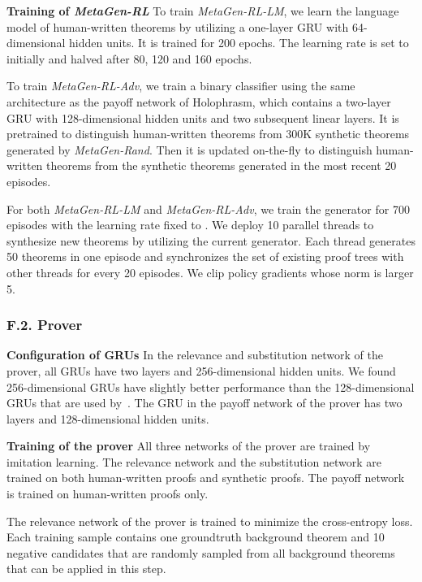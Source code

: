 \documentclass{article}
\begin{document}
\noindent\textbf{Training of \emph{MetaGen-RL}}
To train \emph{MetaGen-RL-LM},
we learn the language model of human-written theorems 
by utilizing
a one-layer GRU with 64-dimensional hidden units. 
It is trained for 200 epochs.
The learning rate is set to  initially and halved after 80, 120 and 160 epochs. 

To train \emph{MetaGen-RL-Adv}, 
we train a binary classifier using the same architecture 
as the payoff network of Holophrasm, 
which contains a two-layer GRU with 128-dimensional hidden units and two subsequent linear layers.
It is pretrained to distinguish human-written theorems from 300K synthetic theorems generated by \emph{MetaGen-Rand}.
Then it is updated on-the-fly to distinguish human-written theorems from the synthetic theorems generated in the most recent 20 episodes. 

For both \emph{MetaGen-RL-LM} and \emph{MetaGen-RL-Adv},
we train the generator 
for 700 episodes with the learning rate fixed to .
We deploy 10 parallel threads to synthesize new theorems by utilizing the current generator. Each thread generates 50 theorems 
in one episode and synchronizes the set  of existing proof trees with other threads for every 20 episodes. 
We clip policy gradients whose norm is larger 5. 

\subsubsection*{F.2. Prover}
\label{app:prover}
\noindent\textbf{Configuration of GRUs}
In the relevance and substitution network of the prover, 
all GRUs have two layers and 256-dimensional hidden units.
We found 256-dimensional GRUs have slightly better performance than the 128-dimensional GRUs that are used by~\citet{whalen2016holophrasm}.
The GRU in the payoff network of the prover
has two layers and 128-dimensional hidden units.

\noindent\textbf{Training of the prover}
All three networks of the prover are trained by imitation  learning. 
The relevance network and the substitution network
are trained on both human-written proofs and  synthetic proofs.
The payoff network is trained on human-written proofs only.

The relevance network of the prover 
is trained to minimize the cross-entropy loss.
Each training sample contains 
one groundtruth background theorem
and 10 negative candidates that are randomly sampled
from all background theorems that can be applied in this step.
\end{document}
